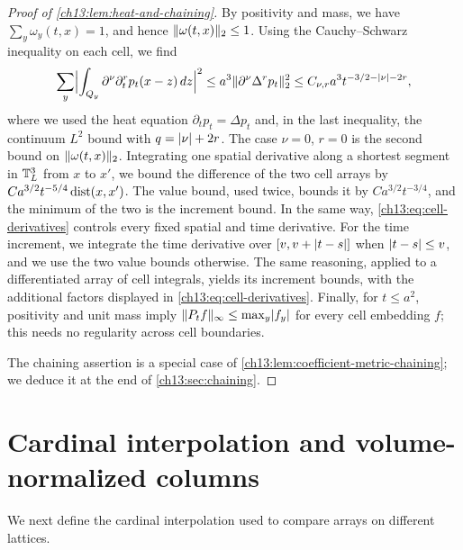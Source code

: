 \begin{proof}[Proof of \cref{ch13:lem:heat-and-chaining}]
By positivity and mass, we have $\sum_y\omega_y(t,x)=1$, and hence $\lVert \omega(t,x)\rVert_2\le1$. Using the Cauchy--Schwarz inequality on each cell, we find
\begin{equation}\label{ch13:eq:cell-derivatives}
 \sum_y\Bigl\lvert\int_{Q_y}\partial^\nu\partial_t^rp_t(x-z)\,dz\Bigr\rvert^2
 \le a^3\lVert \partial^\nu\Delta^rp_t\rVert_2^2
 \le C_{\nu,r}a^3t^{-3/2-\lvert \nu\rvert-2r},
\end{equation}
where we used the heat equation $\partial_tp_t=\Delta p_t$ and, in the last inequality, the continuum $L^2$ bound with $q=\lvert \nu\rvert+2r$. The case $\nu=0$, $r=0$ is the second bound on $\lVert \omega(t,x)\rVert_2$. Integrating one spatial derivative along a shortest segment in $\mathbb T_L^3$ from $x$ to $x'$, we bound the difference of the two cell arrays by $Ca^{3/2}t^{-5/4}\operatorname{dist}(x,x')$. The value bound, used twice, bounds it by $Ca^{3/2}t^{-3/4}$, and the minimum of the two is the increment bound. In the same way, \eqref{ch13:eq:cell-derivatives} controls every fixed spatial and time derivative. For the time increment, we integrate the time derivative over $[v,v+\lvert t-s\rvert]$ when $\lvert t-s\rvert\le v$, and we use the two value bounds otherwise. The same reasoning, applied to a differentiated array of cell integrals, yields its increment bounds, with the additional factors displayed in \eqref{ch13:eq:cell-derivatives}. Finally, for $t\le a^2$, positivity and unit mass imply $\lVert P_tf\rVert_\infty\le\max_y\lvert f_y\rvert$ for every cell embedding $f$; this needs no regularity across cell boundaries.

The chaining assertion is a special case of \cref{ch13:lem:coefficient-metric-chaining}; we deduce it at the end of \cref{ch13:sec:chaining}.
\end{proof}

\section{Cardinal interpolation and volume-normalized columns}\label{ch13:sec:cardinal}

We next define the cardinal interpolation used to compare arrays on different lattices.

